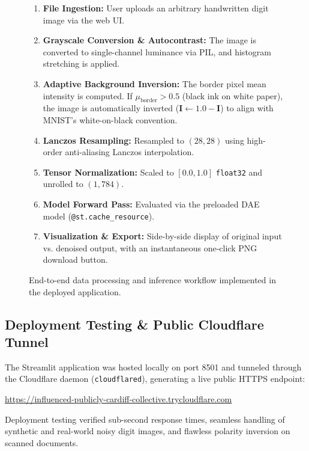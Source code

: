 \documentclass[12pt, a4paper]{article}
\begin{document}
\begin{figure}[htbp]
\centering
\begin{tcolorbox}[colback=gray!5!white,colframe=blue!60!black,title=\textbf{Production Inference Workflow in Streamlit}]
\begin{enumerate}[noitemsep]
    \item \textbf{File Ingestion:} User uploads an arbitrary handwritten digit image via the web UI.
    \item \textbf{Grayscale Conversion \& Autocontrast:} The image is converted to single-channel luminance via PIL, and histogram stretching is applied.
    \item \textbf{Adaptive Background Inversion:} The border pixel mean intensity is computed. If $\mu_{\text{border}} > 0.5$ (black ink on white paper), the image is automatically inverted ($\mathbf{I} \leftarrow 1.0 - \mathbf{I}$) to align with MNIST's white-on-black convention.
    \item \textbf{Lanczos Resampling:} Resampled to $(28, 28)$ using high-order anti-aliasing Lanczos interpolation.
    \item \textbf{Tensor Normalization:} Scaled to $[0.0, 1.0]$ \texttt{float32} and unrolled to $(1, 784)$.
    \item \textbf{Model Forward Pass:} Evaluated via the preloaded DAE model (\texttt{@st.cache\_resource}).
    \item \textbf{Visualization \& Export:} Side-by-side display of original input vs. denoised output, with an instantaneous one-click PNG download button.
\end{enumerate}
\end{tcolorbox}
\caption{End-to-end data processing and inference workflow implemented in the deployed application.}
\label{fig:deployment_flow}
\end{figure}

\subsection{Deployment Testing \& Public Cloudflare Tunnel}
The Streamlit application was hosted locally on port 8501 and tunneled through the Cloudflare daemon (\texttt{cloudflared}), generating a live public HTTPS endpoint:
\begin{center}
    \url{https://influenced-publicly-cardiff-collective.trycloudflare.com}
\end{center}
Deployment testing verified sub-second response times, seamless handling of synthetic and real-world noisy digit images, and flawless polarity inversion on scanned documents.
\end{document}
